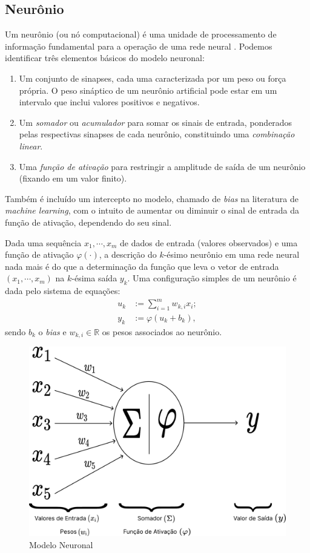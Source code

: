 \documentclass{automatextcc}
\newcommand{\R}{\mathds{R}}
\begin{document}
\subsection{Neurônio}
Um neurônio (ou nó computacional) é uma unidade de processamento de informação fundamental para a operação de uma rede neural \citep{haykin2009}. Podemos identificar três elementos básicos do modelo neuronal:
\begin{enumerate}
    \item Um conjunto de sinapses, cada uma caracterizada por um peso ou força própria. O peso sináptico de um neurônio artificial pode estar em um intervalo que inclui valores positivos e negativos.
    \item Um \textit{somador} ou \textit{acumulador} para somar os sinais de entrada, ponderados pelas respectivas sinapses de cada neurônio, constituindo uma \textit{combinação linear}.
    \item Uma \textit{função de ativação} para restringir a amplitude de saída de um neurônio (fixando em um valor finito).
\end{enumerate}
Também é incluído um intercepto no modelo, chamado de \textit{bias} na literatura de \textit{machine learning}, com o intuito de aumentar ou diminuir o sinal de entrada da função de ativação, dependendo do seu sinal.

Dada uma sequência $x_1,\cdots,x_m$ de dados de entrada (valores observados) e uma função de ativação $\varphi(\cdot)$, a descrição do $k$-ésimo neurônio em uma rede neural nada mais é do que a determinação da função que leva o vetor de entrada $(x_1,\cdots,x_m)$ na $k$-ésima saída $y_k$. Uma configuração simples de um neurônio é dada pelo sistema de equações:
\begin{align*}
    u_k & := \sum_{i=1}^{m} w_{k,i}x_i;\\   
    y_k & := \varphi(u_k + b_k),
\end{align*}
sendo $b_k$ o \textit{bias} e $w_{k,i} \in \R$ os pesos associados ao neurônio.

\begin{figure}
    \centering
    \includegraphics[width=.7\textwidth]{figuras/neuron_model.pdf}
	\caption{Modelo Neuronal \citep[adaptado de][]{haykin2001,hair2005}}
\end{figure}
\end{document}
